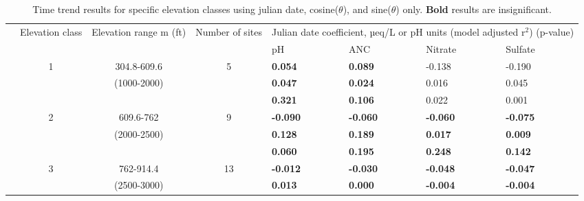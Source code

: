 \begin{table}[p]\scriptsize
\caption{Time trend results for specific elevation classes using julian date, cosine($\theta$), and sine($\theta$) only. \textbf{Bold} results are insignificant.}
\begin{tabular}{ccccllll}
\hline\noalign{\smallskip}
\multicolumn{1}{p{.5cm}}{Time set} & \multicolumn{1}{p{1cm}}{Elevation class} &\multicolumn{1}{p{2cm}}{ Elevation range m (ft)} & \multicolumn{1}{p{1cm}}{Number of sites} & \multicolumn{4}{p{8cm}}{Julian date coefficient, µeq/L or pH units (model adjusted r$^2$) (p-value)}   \\ \cline{5-8}\noalign{\smallskip}
 \multicolumn{1}{c}{} & \multicolumn{1}{c}{} & \multicolumn{1}{c}{} & \multicolumn{1}{c}{} & \multicolumn{ 1}{p{2cm}}{pH} & \multicolumn{1}{p{2cm}}{ANC} & \multicolumn{1}{p{2cm}}{Nitrate} & \multicolumn{1}{p{2cm}}{Sulfate} \\ \hline\noalign{\smallskip}
 \multicolumn{1}{c}{1993-2002} &  \multicolumn{1}{c}{1} &  \multicolumn{1}{p{2cm}}{304.8-609.6} &  \multicolumn{1}{c}{5} & \textbf{0.054} &\textbf{0.089 } & -0.138  & -0.190  \\ 
 \multicolumn{1}{c}{} &  \multicolumn{1}{c}{} &  \multicolumn{1}{p{2cm}}{ (1000-2000)} &  \multicolumn{1}{c}{} & \textbf{0.047}&  \textbf{0.024 } & 0.016  & 0.045  \\ 
 \multicolumn{1}{c}{} &  \multicolumn{1}{c}{} &  \multicolumn{1}{c}{} &  \multicolumn{1}{c}{} &\textbf{0.321}&  \textbf{0.106 } & 0.022  & 0.001   \\ \cline{5-8}\noalign{\smallskip}
 \multicolumn{1}{c}{} &  \multicolumn{1}{c}{2} &  \multicolumn{1}{p{2cm}}{609.6-762} &  \multicolumn{1}{c}{9} &\textbf{-0.090}&  \textbf{-0.060 } & \textbf{-0.060 } & \textbf{-0.075 } \\ 
 \multicolumn{1}{c}{} &  \multicolumn{1}{c}{} &  \multicolumn{1}{p{2cm}}{(2000-2500)} &  \multicolumn{1}{c}{} &\textbf{0.128}&  \textbf{0.189 } & \textbf{0.017 } & \textbf{0.009 }   \\ 
 \multicolumn{1}{c}{} &  \multicolumn{1}{c}{} &  \multicolumn{1}{c}{} &  \multicolumn{1}{c}{} & \textbf{0.060 } &\textbf{0.195}& \textbf{0.248 } & \textbf{0.142 }  \\ \cline{5-8}\noalign{\smallskip}
 \multicolumn{1}{c}{} &  \multicolumn{1}{c}{3} &  \multicolumn{1}{p{2cm}}{762-914.4} &  \multicolumn{1}{c}{13}&\textbf{-0.012} & \textbf{-0.030 } & \textbf{-0.048 } & \textbf{-0.047 }  \\ 
 \multicolumn{1}{c}{} &  \multicolumn{1}{c}{} & \multicolumn{1}{p{2cm}}{(2500-3000)} & \multicolumn{1}{c}{} &\textbf{0.013}&\textbf{0.000 } & \textbf{-0.004 } & \textbf{-0.004 } \\

\end{tabular}
\end{table}
